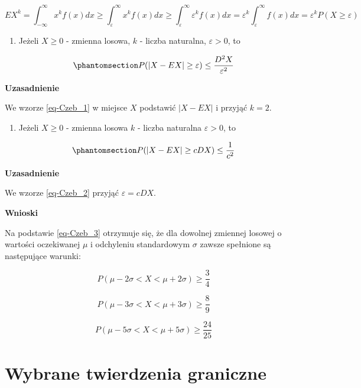 \documentclass[
  letterpaper,
  DIV=11,
  numbers=noendperiod]{scrreprt}
\providecommand{\tightlist}{%
  \setlength{\itemsep}{0pt}\setlength{\parskip}{0pt}}\usepackage{longtable,booktabs,array}
\begin{document}
\[EX^k= \int_{-\infty}^{\infty}x^kf(x)dx \ge \int_{\varepsilon}^{\infty}x^kf(x)dx \ge \int_{\varepsilon}^{\infty} \varepsilon^kf(x)dx = \varepsilon^k \int_{\varepsilon}^{\infty}f(x)dx = \varepsilon^k P(X \ge \varepsilon)\]

\begin{enumerate}
\def\labelenumi{\arabic{enumi}.}
\setcounter{enumi}{1}
\tightlist
\item
  Jeżeli \(X \ge 0\) - zmienna losowa, \(k\) - liczba naturalna,
  \(\varepsilon >0\), to
\end{enumerate}

\begin{equation}\phantomsection\label{eq-Czeb_2}{ P(|X-EX| \ge \varepsilon) \le \frac{D^2X}{\varepsilon^2}}\end{equation}

\textbf{Uzasadnienie}

We wzorze \ref{eq-Czeb_1} w miejsce \(X\) podstawić \(|X-EX|\) i przyjąć
\(k = 2\).

\begin{enumerate}
\def\labelenumi{\arabic{enumi}.}
\setcounter{enumi}{2}
\tightlist
\item
  Jeżeli \(X \ge 0\) - zmienna losowa \(k\) - liczba naturalna
  \(\varepsilon > 0\), to
\end{enumerate}

\begin{equation}\phantomsection\label{eq-Czeb_3}{ P(|X-EX| \ge cDX) \le \frac{1}{c^2}}\end{equation}

\textbf{Uzasadnienie}

We wzorze \ref{eq-Czeb_2} przyjąć \(\varepsilon = cDX\).

\textbf{Wnioski}

Na podstawie \ref{eq-Czeb_3} otrzymuje się, że dla dowolnej zmiennej
losowej o wartości oczekiwanej \(\mu\) i odchyleniu standardowym
\(\sigma\) zawsze spełnione są następujące warunki:

\[ P(\mu-2\sigma < X <  \mu+2\sigma) \ge \frac{3}{4}\]

\[ P(\mu-3\sigma < X <  \mu+3\sigma) \ge \frac{8}{9}\]

\[ P(\mu-5\sigma < X <  \mu+5\sigma) \ge \frac{24}{25}\]

\section{Wybrane twierdzenia
graniczne}\label{wybrane-twierdzenia-graniczne}
\end{document}
